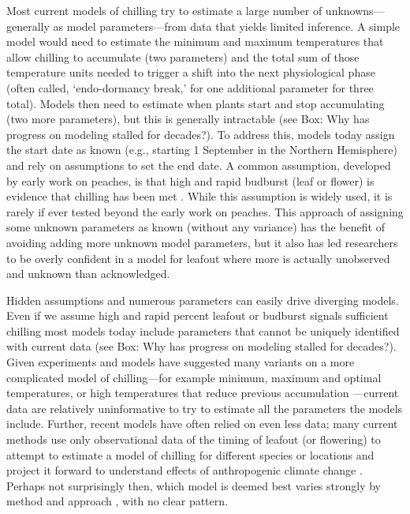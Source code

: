 \documentclass[11pt]{article}
\begin{document}
Most current models of chilling try to estimate a large number of unknowns---generally as model parameters---from data that yields limited inference. A simple model would need to estimate the minimum and maximum temperatures that allow chilling to accumulate (two parameters) and the total sum of those temperature units needed to trigger a shift into the next physiological phase (often called, `endo-dormancy break,' for one additional parameter for three total). Models then need to estimate  when plants start and stop accumulating (two more parameters), but this is generally intractable (see Box: Why has progress on modeling stalled for decades?). To address this, models today assign the start date as known (e.g., starting 1 September in the Northern Hemisphere) and rely on assumptions to set the end date. A common assumption, developed by early work on peaches, is that high and rapid budburst (leaf or flower) is evidence that chilling has been met \citep{erez1971}. While this assumption is widely used, it is rarely if ever tested beyond the early work on peaches. This approach of assigning some unknown parameters as known (without any variance) has the benefit of avoiding adding more unknown model parameters, but it also has led researchers to be overly confident in a model for leafout where more is actually unobserved and unknown than acknowledged. 

Hidden assumptions and numerous parameters can easily drive diverging models. Even if we assume high and rapid percent leafout or budburst signals sufficient chilling most models today include parameters that cannot be uniquely identified with current data (see Box: Why has progress on modeling stalled for decades?).  Given experiments and models have suggested many variants on a more complicated model of chilling---for example minimum, maximum and optimal temperatures, or high temperatures that reduce previous accumulation \citep[Fig. \ref{fig:modelsketch}][]{lued2011,luedeling2012chilling,chuine2016}---current data are relatively uninformative to try to estimate all the parameters the models include. Further, recent models have often relied on even less data; many current methods use only observational data of the timing of leafout (or flowering) to attempt to estimate a model of chilling for different species or locations and project it forward to understand effects of anthropogenic climate change \citep{lued2011,luedeling2012chilling,gao2024}. Perhaps not surprisingly then, which model is deemed best varies strongly by method and approach \citep{Caffarra:2011qf,basler2016evaluating,hufkens2018integrated}, with no clear pattern. 
\end{document}
